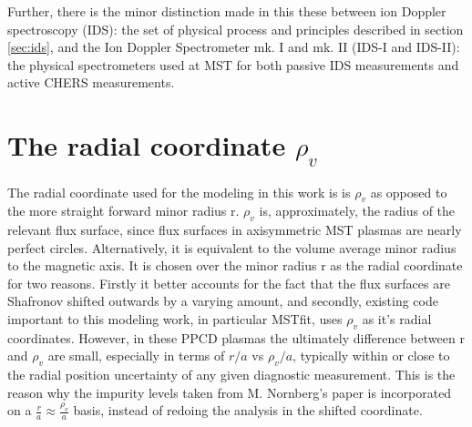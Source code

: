 \begin{refsection}
Further, there is the minor distinction made in this these between ion Doppler spectroscopy (IDS): the set of physical process and principles described in section \ref{sec:ids}, and the Ion Doppler Spectrometer mk. I and mk. II (IDS-I and IDS-II): the physical spectrometers used at MST for both passive IDS measurements and active CHERS measurements.

\section{The radial coordinate $\rho_v$}\label{app:rhov}

The radial coordinate used for the modeling in this work is is $\rho_v$ as opposed to the more straight forward minor radius r. $\rho_v$ is, approximately, the radius of the relevant flux surface, since flux surfaces in axisymmetric MST plasmas are nearly perfect circles. Alternatively, it is equivalent to the volume average minor radius to the magnetic axis. It is chosen over the minor radius r as the radial coordinate for two reasons. Firstly it better accounts for the fact that the flux surfaces are Shafronov shifted outwards by a varying amount, and secondly, existing code important to this modeling work, in particular MSTfit, uses $\rho_v$ as it's radial coordinates. However, in these PPCD plasmas the ultimately difference between r and $\rho_v$ are small, especially in terms of $r/a$ vs $\rho_v/a$, typically within or close to the radial position uncertainty of any given diagnostic measurement. This is the reason why the impurity levels taken from M. Nornberg's paper\cite{Nornberg2018} is incorporated on a $\frac{r}{a}\approx\frac{\rho_v}{a}$ basis, instead of redoing the analysis in the shifted coordinate. 


\printbibliography
\end{refsection}